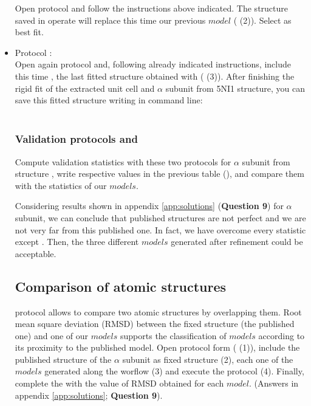 \begin{itemize}
    Open \powerfit protocol and follow the instructions above indicated. The structure saved in \chimera operate will replace this time our previous $model$ ( (2)). Select  as best fit.\\
    
    \item Protocol :\\
    Open again \chimera {} protocol and, following already indicated instructions, include this time , the last fitted structure obtained with \powerfit ( (3)). After finishing the rigid fit of the extracted unit cell and  $\alpha$ subunit from 5NI1 structure, you can save this fitted structure writing in \chimera command line:\\
    \\
    
    \subsubsection*{Validation protocols  and }
    Compute validation statistics with these two protocols for  $\alpha$ subunit from  structure , write respective values in the previous table (), and compare them with the statistics of our $models$.
    
    Considering results shown in appendix \ref{app:solutions} (\textbf{Question 9}) for  $\alpha$ subunit, we can conclude that published structures are not perfect and we are not very far from this published one. In fact, we have overcome every statistic except \ccmask. Then, the three different $models$ generated after \coot refinement could be acceptable. \\

 
  \subsection*{Comparison of atomic structures}
  
  \phenix protocol  allows to compare two atomic structures by overlapping them. Root mean square deviation (RMSD) between the fixed structure (the published one) and one of our $models$ supports the classification of $models$ according to its proximity to the published model. Open \phenix {} protocol form ( (1)), include the published structure of the  $\alpha$ subunit as fixed structure (2), each one of the $models$ generated along the worflow (3) and execute the protocol (4). Finally, complete the  with the value of RMSD obtained for each $model$. (Answers in appendix \ref{app:solutions}; \textbf{Question 9}).
  

\end{itemize}
